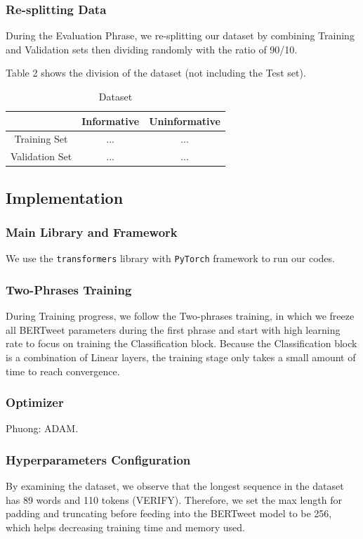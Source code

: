 \documentclass[11pt,a4paper]{article}
\begin{document}
\subsubsection{Re-splitting Data}
During the Evaluation Phrase, we re-splitting our dataset by combining Training and Validation sets then dividing randomly with the ratio of 90/10.

Table 2 shows the division of the dataset (not including the Test set).
\begin{table}
    \centering
    \begin{tabular}{|c|c|c|}
        \hline
         & \bf{Informative} & \bf{Uninformative} \\ \hline
        Training Set & ... & ... \\ \hline
        Validation Set & ... & ... \\ \hline
    \end{tabular}
    \caption{Dataset}
    \label{tab:Dataset}
\end{table}

\subsection{Implementation}
\subsubsection{Main Library and Framework}
We use the \texttt{transformers} library \cite{1910.03771} with \texttt{PyTorch} framework \cite{paszke2017automatic} to run our codes.

\subsubsection{Two-Phrases Training}
During Training progress, we follow the Two-phrases training, in which we freeze all BERTweet parameters during the first phrase and start with high learning rate to focus on training the Classification block. Because the Classification block is a combination of Linear layers, the training stage only takes a small amount of time to reach convergence.

\subsubsection{Optimizer}
Phuong: ADAM.

\subsubsection{Hyperparameters Configuration}
By examining the dataset, we observe that the longest sequence in the dataset has 89 words and 110 tokens (VERIFY). Therefore, we set the max length for padding and truncating before feeding into the BERTweet model to be 256, which helps decreasing training time and memory used.
\end{document}
